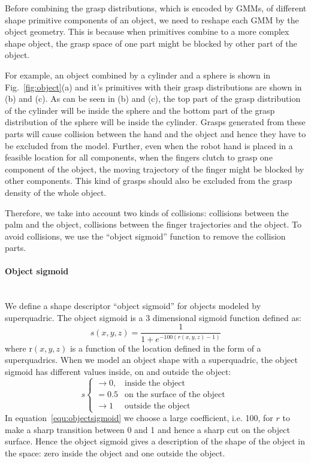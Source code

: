 Before combining the grasp distributions, which is encoded by GMMs, of different shape primitive components of an object, we need to reshape each GMM by the object geometry. This is because when primitives combine to a more complex shape object, the grasp space of one part might be blocked by other part of the object.

For example, an object combined by a cylinder and a sphere is shown in Fig.~\ref{fig:object}(a) and it's primitives with their grasp distributions are shown in (b) and (c). As can be seen in (b) and (c), the top part of the grasp distribution of the cylinder will be inside the sphere and the bottom part of the grasp distribution of the sphere will be inside the cylinder. Grasps generated from these parts will cause collision between the hand and the object and hence they have to be excluded from the model. Further, even when the robot hand is placed in a feasible location for all components, when the fingers clutch to grasp one component of the object, the moving trajectory of the finger might be blocked by other components. This kind of grasps should also be excluded from the grasp density of the whole object.

Therefore, we take into account two kinds of collisions: collisions between the palm and the object, collisions between the finger trajectories and the object. To avoid collisions, we use the ``object sigmoid'' function to remove the collision parts.

\paragraph{Object sigmoid} ~\\
\label{cha3:sec4:combine:sigmoid}
We define a shape descriptor ``object sigmoid'' for objects modeled by superquadric. The object sigmoid is a 3 dimensional sigmoid function defined as:
\begin{equation}
s\left(x, y ,z\right) = \frac{1}{1+e^{-100\left(r\left(x, y ,z\right)-1\right)}}
\label{equ:objectsigmoid}
\end{equation}
where r$\left(x, y ,z\right)$ is a function of the location defined in the form of a superquadrics. When we model an object shape with a superquadric, the object sigmoid has different values inside, on and outside the object:
\begin{equation}
    s
    \begin{cases}
        \rightarrow0, & \text{inside the object}\  \\
        =0.5 & \text{on the surface of the object}\ \\
        \rightarrow1 & \text{outside the object}
    \end{cases}
\end{equation}
In equation~\ref{equ:objectsigmoid} we choose a large coefficient, i.e. 100, for $r$ to make a sharp transition between 0 and 1 and hence a sharp cut on the object surface. Hence the object sigmoid gives a description of the shape of the object in the space: zero inside the object and one outside the object.

